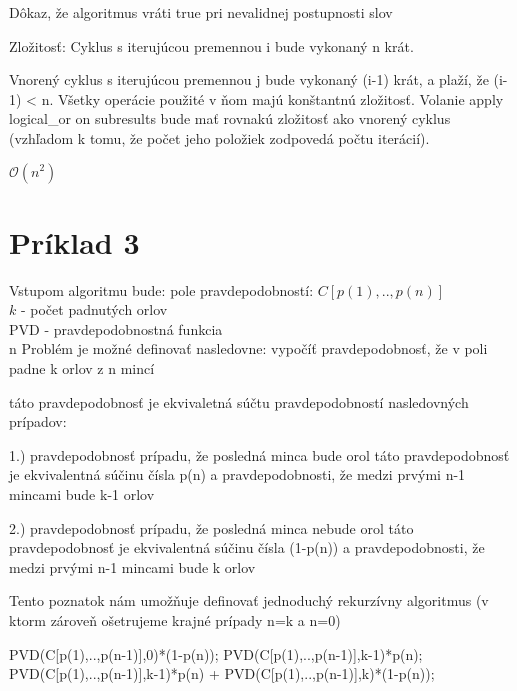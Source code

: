 \documentclass[paper=a4, fontsize=11pt]{scrartcl} %
\numberwithin{equation}{section} %
\numberwithin{figure}{section} %
\numberwithin{table}{section} %
\begin{document}
	
Dôkaz, že algoritmus vráti true pri nevalidnej postupnosti slov

	
	
	
	
	
	



 
Zložitosť:
Cyklus s iterujúcou premennou i bude vykonaný n krát.

Vnorený cyklus s iterujúcou premennou j bude vykonaný (i-1) krát, a plaží, že (i-1) < n. Všetky operácie použité v ňom majú konštantnú zložitosť.
Volanie apply logical\_or on subresults bude mať rovnakú zložitosť ako vnorený cyklus (vzhľadom k tomu, že počet jeho položiek zodpovedá počtu iterácií).

$\mathcal{O}(n^2)$

\pagebreak


\section*{Príklad 3}

Vstupom algoritmu bude:
pole pravdepodobností: $C[p(1),..,p(n)]$\\
$k$ - počet padnutých orlov\\
PVD - pravdepodobnostná funkcia\\
n
Problém je možné definovať nasledovne: 
vypočíť pravdepodobnosť, že v poli padne k orlov z n mincí

táto pravdepodobnosť je ekvivaletná súčtu pravdepodobností nasledovných prípadov:

1.) pravdepodobnosť prípadu, že posledná minca bude orol
táto pravdepodobnosť je ekvivalentná súčinu čísla p(n) a pravdepodobnosti, že medzi prvými n-1 mincami bude k-1 orlov

2.) pravdepodobnosť prípadu, že posledná minca nebude orol
táto pravdepodobnosť je ekvivalentná súčinu čísla (1-p(n)) a pravdepodobnosti, že medzi prvými n-1 mincami bude k orlov

Tento poznatok nám umožňuje definovať jednoduchý rekurzívny algoritmus (v ktorm zároveň ošetrujeme krajné prípady n=k a n=0)

\begin{algorithmic}[1]
            \State \Return PVD(C[p(1),..,p(n-1)],0)*(1-p(n));
        \EndIf
            \State \Return PVD(C[p(1),..,p(n-1)],k-1)*p(n);
        \EndIf
        \State \Return PVD(C[p(1),..,p(n-1)],k-1)*p(n) + PVD(C[p(1),..,p(n-1)],k)*(1-p(n));
    \EndFunction
\end{algorithmic}
\ \\
\end{document}
